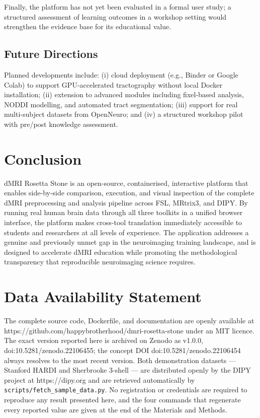 \documentclass[12pt,a4paper]{article}
\begin{document}
Finally, the platform has not yet been evaluated in a formal user study; a structured assessment of learning outcomes in a workshop setting would strengthen the evidence base for its educational value.

\subsection{Future Directions}\label{future-directions}

Planned developments include: (i) cloud deployment (e.g., Binder or Google Colab) to support GPU-accelerated tractography without local Docker installation; (ii) extension to advanced modules including fixel-based analysis, NODDI modelling, and automated tract segmentation; (iii) support for real multi-subject datasets from OpenNeuro; and (iv) a structured workshop pilot with pre/post knowledge assessment.

\section{Conclusion}\label{conclusion}

dMRI Rosetta Stone is an open-source, containerised, interactive platform that enables side-by-side comparison, execution, and visual inspection of the complete dMRI preprocessing and analysis pipeline across FSL, MRtrix3, and DIPY. By running real human brain data through all three toolkits in a unified browser interface, the platform makes cross-tool translation immediately accessible to students and researchers at all levels of experience. The application addresses a genuine and previously unmet gap in the neuroimaging training landscape, and is designed to accelerate dMRI education while promoting the methodological transparency that reproducible neuroimaging science requires.

\section{Data Availability Statement}\label{data-availability-statement}

The complete source code, Dockerfile, and documentation are openly available at https://github.com/happybrotherhood/dmri-rosetta-stone under an MIT licence. The exact version reported here is archived on Zenodo as v1.0.0, doi:10.5281/zenodo.22106455; the concept DOI doi:10.5281/zenodo.22106454 always resolves to the most recent version. Both demonstration datasets --- Stanford HARDI and Sherbrooke 3-shell --- are distributed openly by the DIPY project at https://dipy.org and are retrieved automatically by \texttt{scripts/fetch\_sample\_data.py}. No registration or credentials are required to reproduce any result presented here, and the four commands that regenerate every reported value are given at the end of the Materials and Methods.
\end{document}
